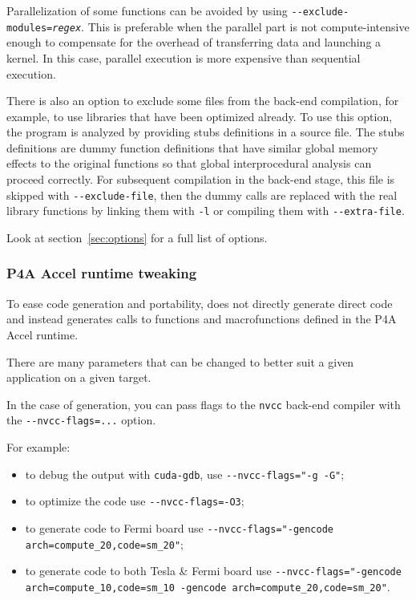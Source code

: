 \documentclass[a4paper]{article}
\begin{document}
Parallelization of some functions can be avoided by using
\texttt{-{}-exclude-modules=\emph{regex}}. This is preferable when the
parallel part is not compute-intensive enough to compensate for
the overhead of transferring data and launching a kernel. In this
case, parallel execution is more expensive than sequential execution.

There is also an option to exclude some files from the back-end
compilation, for example, to use libraries that have been optimized
already. To use this option,
the program is analyzed by providing stubs definitions in a source
file. The stubs definitions
are dummy function definitions that have similar global memory
effects to the original functions so that \Apips global
interprocedural analysis can proceed correctly. For subsequent compilation
in the back-end stage, this file is skipped with \verb|--exclude-file|, then
the dummy calls are replaced with the real library functions by linking
them with \texttt{-l} or compiling them with \verb|--extra-file|.

Look at section~\ref{sec:options} for a full list of options.


\subsubsection{P4A Accel runtime tweaking}
\label{sec:p4a-accel-runtime}

To ease code generation and portability, \Apfa does not directly generate
direct \Acuda code and instead generates calls to functions and
macrofunctions defined in the P4A Accel runtime.

There are many parameters that can be changed to better suit a given
application on a given target.

In the case of \Acuda generation, you can pass flags to the \texttt{nvcc}
back-end compiler with the \verb|--nvcc-flags=...| option.

For example:
\begin{itemize}
\item to debug the output with \texttt{cuda-gdb}, use
  \verb|--nvcc-flags="-g -G"|;
\item to optimize the \Acuda code use \verb|--nvcc-flags=-O3|;
\item  to generate code to Fermi board use
  \verb|--nvcc-flags="-gencode arch=compute_20,code=sm_20"|;
\item to generate code to both Tesla \& Fermi board use
  \verb|--nvcc-flags="-gencode arch=compute_10,code=sm_10 -gencode arch=compute_20,code=sm_20"|.
\end{itemize}
\end{document}
